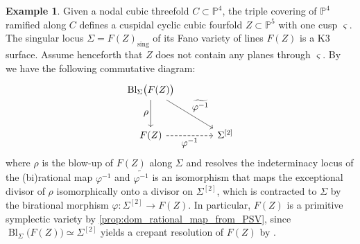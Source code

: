\documentclass[10pt]{amsart}
\let\ts\textstyle
\theoremstyle{plain}
\theoremstyle{definition}
\newtheorem{exa}[thm]{Example}
\renewcommand{\P}{\mathbb{P}}
\DeclareMathOperator{\Bl}{Bl}
\begin{document}
\begin{exa}
\label{example:PEV_from_CCCF}
Given a nodal cubic threefold $C \subset \P^4$, the triple covering of $\P^4$ ramified along $C$ defines a cuspidal cyclic cubic fourfold $Z \subset \P^5$ with one cusp $\varsigma$. The singular locus $\Sigma = F(Z)_\text{sing}$ of its Fano variety of lines $F(Z)$ is a K3 surface.
Assume henceforth that $Z$ does not contain any planes through $\varsigma$. By~\cite[Th.\,4.1(1)(3)]{BHS25} we have the following commutative diagram:
\[
\begin{tikzcd}[row sep = large, column sep = large]
\Bl_{\Sigma}\bigl(F(Z)\bigr) \arrow[d, "\ts \rho" swap] \arrow[rd, "\ts \widetilde{\varphi^{-1}}"]
\\
F(Z) \arrow[r, "\ts \varphi^{-1}" swap, dashed] & {\Sigma^{[2]}}
\end{tikzcd}
\]
where $\rho$ is the blow-up of $F(Z)$ along $\Sigma$ and resolves the indeterminacy locus of the (bi)rational map $\varphi^{-1}$ and $\widetilde{\varphi^{-1}}$ is an isomorphism that maps the exceptional divisor of $\rho$ isomorphically onto a divisor on $\Sigma^{[2]}$,
which is contracted to $\Sigma$ by the birational morphism $\varphi \colon \Sigma^{[2]} \to F(Z)$.
In particular, $F(Z)$ is a primitive symplectic variety by \autoref{prop:dom_rational_map_from_PSV}, since $\Bl_{\Sigma} \bigl(F(Z) \bigr) \simeq \Sigma^{[2]}$ yields a crepant resolution of $F(Z)$ by \cite[Th.\,4.1(2)]{BHS25}.


\end{exa}
\end{document}
